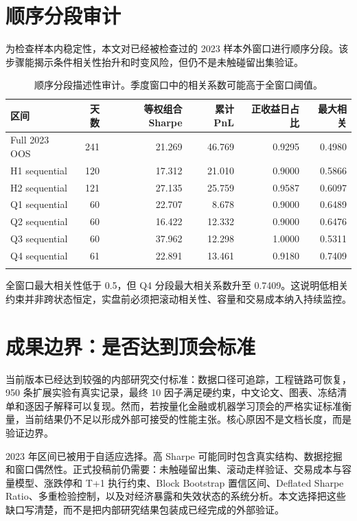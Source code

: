 \documentclass[10pt,a4paper]{article}
\begin{document}
\section{顺序分段审计}
为检查样本内稳定性，本文对已经被检查过的 2023 样本外窗口进行顺序分段。该步骤能揭示条件相关性抬升和时变风险，但仍不是未触碰留出集验证。

\begin{longtable}{lrrrrr}
\toprule
区间 & 天数 & 等权组合 Sharpe & 累计 PnL & 正收益日占比 & 最大相关 \\
\midrule
\endhead
Full 2023 OOS & 241 & 21.269 & 46.769 & 0.9295 & 0.4980 \\
H1 sequential & 120 & 17.312 & 21.010 & 0.9000 & 0.5866 \\
H2 sequential & 121 & 27.135 & 25.759 & 0.9587 & 0.6097 \\
Q1 sequential & 60 & 22.707 & 8.678 & 0.9000 & 0.6489 \\
Q2 sequential & 60 & 16.422 & 12.332 & 0.9000 & 0.6476 \\
Q3 sequential & 60 & 37.962 & 12.298 & 1.0000 & 0.5311 \\
Q4 sequential & 61 & 22.891 & 13.461 & 0.9180 & 0.7409 \\
\bottomrule
\caption{顺序分段描述性审计。季度窗口中的相关系数可能高于全窗口阈值。}
\end{longtable}

全窗口最大相关性低于 0.5，但 Q4 分段最大相关系数升至 0.7409。这说明低相关约束并非跨状态恒定，实盘前必须把滚动相关性、容量和交易成本纳入持续监控。

\section{成果边界：是否达到顶会标准}
当前版本已经达到较强的内部研究交付标准：数据口径可追踪，工程链路可恢复，950 条扩展实验有真实记录，最终 10 因子满足硬约束，中文论文、图表、冻结清单和逐因子解释可以复现。然而，若按量化金融或机器学习顶会的严格实证标准衡量，当前结果仍不足以形成外部可接受的性能主张。核心原因不是文档长度，而是验证边界。

2023 年区间已被用于自适应选择。高 Sharpe 可能同时包含真实结构、数据挖掘和窗口偶然性。正式投稿前仍需要：未触碰留出集、滚动走样验证、交易成本与容量模型、涨跌停和 T+1 执行约束、Block Bootstrap 置信区间、Deflated Sharpe Ratio、多重检验控制，以及对经济暴露和失效状态的系统分析。本文选择把这些缺口写清楚，而不是把内部研究结果包装成已经完成的外部验证。
\end{document}
